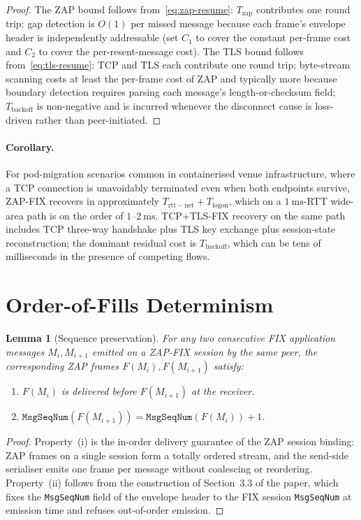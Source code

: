\documentclass[11pt,a4paper]{article}
\newtheorem{lemma}{Lemma}
\begin{document}
\begin{proof}
The ZAP bound follows from~\eqref{eq:zap-resume}: $T_{\mathrm{zap}}$
contributes one round trip; gap detection is $O(1)$ per missed
message because each frame's envelope header is independently
addressable (set $C_1$ to cover the constant per-frame cost and
$C_2$ to cover the per-resent-message cost). The TLS bound
follows from~\eqref{eq:tls-resume}: TCP and TLS each contribute one
round trip; byte-stream scanning costs at least the per-frame cost
of ZAP and typically more because boundary detection requires
parsing each message's length-or-checksum field; $T_{\mathrm{backoff}}$
is non-negative and is incurred whenever the disconnect cause is
loss-driven rather than peer-initiated.
\end{proof}

\paragraph{Corollary.}
For pod-migration scenarios common in containerised venue
infrastructure, where a TCP connection is unavoidably terminated
even when both endpoints survive, ZAP-FIX recovers in approximately
$T_{\mathrm{rtt-net}} + T_{\mathrm{logon}}$, which on a
$1~\mathrm{ms}$-RTT wide-area path is on the order of
$1$--$2~\mathrm{ms}$. TCP+TLS-FIX recovery on the same path
includes TCP three-way handshake plus TLS key exchange plus
session-state reconstruction; the dominant residual cost is
$T_{\mathrm{backoff}}$, which can be tens of milliseconds in the
presence of competing flows.

\section{Order-of-Fills Determinism}
\label{sec:determinism}

\begin{lemma}[Sequence preservation]
\label{lem:seq}
For any two consecutive FIX application messages $M_i, M_{i+1}$
emitted on a ZAP-FIX session by the same peer, the corresponding
ZAP frames $F(M_i), F(M_{i+1})$ satisfy:
\begin{enumerate}
  \item $F(M_i)$ is delivered before $F(M_{i+1})$ at the receiver.
  \item $\texttt{MsgSeqNum}(F(M_{i+1})) =
        \texttt{MsgSeqNum}(F(M_i)) + 1$.
\end{enumerate}
\end{lemma}

\begin{proof}
Property~(i) is the in-order delivery guarantee of the ZAP session
binding: ZAP frames on a single session form a totally ordered
stream, and the send-side serialiser emits one frame per message
without coalescing or reordering. Property~(ii) follows from the
construction of Section~3.3 of the paper, which fixes the
\texttt{MsgSeqNum} field of the envelope header to the FIX session
\texttt{MsgSeqNum} at emission time and refuses out-of-order
emission.
\end{proof}
\end{document}
